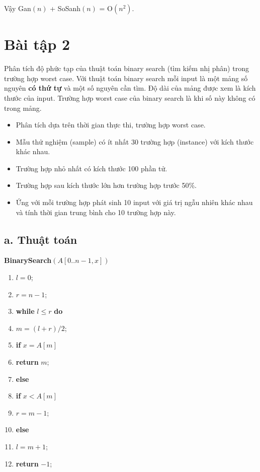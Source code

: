 \documentclass[12pt, a4paper, fleqn]{article}
\begin{document}
	Vậy Gan$(n)$ + SoSanh$(n)$ = O$(n^2)$.
	
	\clearpage

	\section*{Bài tập 2}
	
	
	Phân tích độ phức tạp của thuật toán binary search (tìm kiếm nhị phân) trong trường hợp worst case. Với thuật toán binary search mỗi input là một mảng số nguyên \textbf{có thứ tự} và một số nguyên cần tìm. Độ dài của mảng được xem là kích thước của input. Trường hợp worst case của binary search là khi số này không có trong mảng.
	\begin{itemize}
		\item Phân tích dựa trên thời gian thực thi, trường hợp worst case.
		\item Mẫu thử nghiệm (sample) có ít nhất 30 trường hợp (instance) với kích thước khác nhau.
		\item Trường hợp nhỏ nhất có kích thước 100 phần tử.
		\item Trường hợp sau kích thước lớn hơn trường hợp trước 50\%.
		\item Ứng với mỗi trường hợp phát sinh 10 input với giá trị ngẫu nhiên khác nhau và tính thời gian trung bình cho 10 trường hợp này.
	\end{itemize}
	
	\subsection*{a. Thuật toán}
	
	\textbf{BinarySearch}$(A[0..n - 1, x])$	
	
	\begin{enumerate}
		\item $l = 0$;
		\item $r = n - 1$;
		\item \textbf{while} $l \leq r$ \textbf{do}
		\item \qquad $m = (l + r) / 2$;
		\item \qquad \textbf{if} $x = A[m]$
		\item \qquad \qquad \textbf{return} $m$;
		\item \qquad \textbf{else}
		\item \qquad \qquad \textbf{if} $x < A[m]$
		\item \qquad \qquad \qquad $r = m - 1$;
		\item \qquad \qquad \textbf{else}
		\item \qquad \qquad \qquad $l = m + 1$;
		\item \textbf{return} $-1$;
	\end{enumerate}
\end{document}
